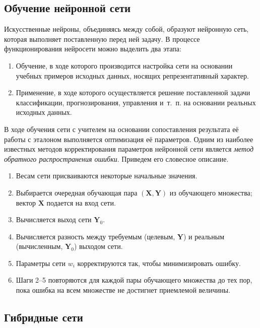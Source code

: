 \subsection{Обучение нейронной сети}

Искусственные нейроны, объединяясь между собой, образуют нейронную сеть,
которая выполняет поставленную перед ней задачу.
В процессе функционирования нейросети можно выделить два этапа:
\begin{enumerate}
\item Обучение, в ходе которого производится настройка сети на основании
  учебных примеров исходных данных, носящих репрезентативный характер.
\item Применение, в ходе которого осуществляется решение
  поставленной задачи классификации, прогнозирования, управления и~т.~п.
  на основании реальных исходных данных.
\end{enumerate}

В ходе обучения сети с учителем на основании сопоставления
результата её работы с эталоном выполняется оптимизация её параметров.
Одним из наиболее известных методов корректирования параметров нейронной сети
является \emph{метод обратного распространения ошибки}.
Приведем его словесное описание.
\begin{enumerate}
\item Весам сети присваиваются некоторые начальные значения.
\item Выбирается очередная обучающая пара \( (\mathbf{X}, \mathbf{Y}) \)
  из обучающего множества; вектор \( \mathbf{X} \) подается на вход сети.
\item Вычисляется выход сети \( \mathbf{Y}_0 \).
\item Вычисляется разность между требуемым (целевым, \( \mathbf{Y} \))
  и реальным (вычисленным, \( \mathbf{Y}_0 \)) выходом сети.
\item Параметры сети \( w_i \) корректируются так, чтобы минимизировать ошибку.
\item Шаги 2--5 повторяются для каждой пары обучающего множества до тех пор,
  пока ошибка на всем множестве не достигнет приемлемой величины.
\end{enumerate}

\subsection{Гибридные сети}

